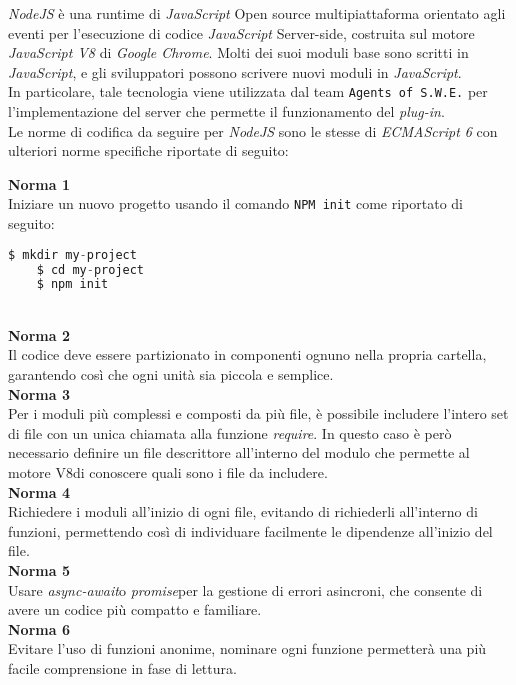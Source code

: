 \textit{NodeJS} è una runtime di \textit{JavaScript} Open source multipiattaforma orientato agli eventi per l'esecuzione di codice \textit{JavaScript} Server-side, costruita sul motore \textit{JavaScript V8} di \textit{Google Chrome}. Molti dei suoi moduli base sono scritti in \textit{JavaScript}, e gli sviluppatori possono scrivere nuovi moduli in \textit{JavaScript}.\\
In particolare, tale tecnologia viene utilizzata dal team \texttt{Agents of S.W.E.} per l'implementazione del server che permette il funzionamento del \textit{plug-in}. \\
Le norme di codifica da seguire per \textit{NodeJS} sono le stesse di \textit{ECMAScript 6} con ulteriori norme specifiche riportate di seguito:

\textbf{Norma 1} \\
Iniziare un nuovo progetto usando il comando \texttt{NPM init} come riportato di seguito:
\begin{lstlisting}[language=JavaScript]
	$ mkdir my-project
	$ cd my-project
	$ npm init
\end{lstlisting}

\-\\

\textbf{Norma 2} \\
Il codice deve essere partizionato in componenti ognuno nella propria cartella, garantendo così che ogni unità sia piccola e semplice. 
\-\\

\textbf{Norma 3} \\
Per i moduli più complessi e composti da più file, è possibile includere l’intero set di file con un unica chiamata alla funzione \textit{require}\glossario. In questo caso è però necessario definire un file descrittore all’interno del modulo che permette al motore V8\glossario di conoscere quali sono i file da includere.
\-\\

\textbf{Norma 4} \\
Richiedere i moduli all'inizio di ogni file, evitando di richiederli all'interno di funzioni, permettendo così di individuare facilmente le dipendenze all'inizio del file.
\-\\

\textbf{Norma 5} \\
Usare \textit{async-await}\glossario o \textit{promise}\glossario per la gestione di errori asincroni, che consente di avere un codice più compatto e familiare.
\-\\

\textbf{Norma 6} \\
Evitare l'uso di funzioni anonime, nominare ogni funzione permetterà una più facile comprensione in fase di lettura.
\-\\

  



